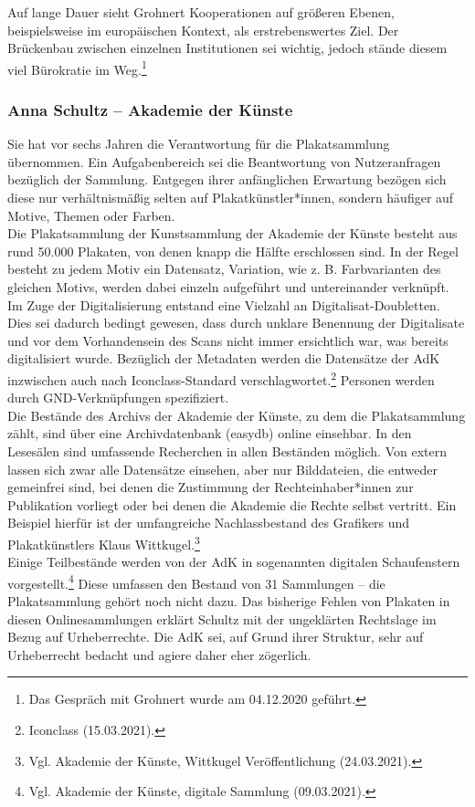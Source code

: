 \documentclass[a4paper,12pt,ngerman]{article}
\begin{document}
Auf lange Dauer sieht Grohnert Kooperationen auf größeren Ebenen, beispielsweise im europäischen Kontext, als erstrebenswertes Ziel. Der Brückenbau zwischen einzelnen Institutionen sei wichtig, jedoch stände diesem viel Bürokratie im Weg.\footnote{Das Gespräch mit Grohnert wurde am 04.12.2020 geführt.} \\

\subsubsection{Anna Schultz – Akademie der Künste}
Sie hat vor sechs Jahren die Verantwortung für die Plakatsammlung übernommen. Ein Aufgabenbereich sei die Beantwortung von Nutzeranfragen bezüglich der Sammlung. Entgegen ihrer anfänglichen Erwartung bezögen sich diese nur verhältnismäßig selten auf Plakatkünstler*innen, sondern häufiger auf Motive, Themen oder Farben. \\
Die Plakatsammlung der Kunstsammlung der Akademie der Künste besteht aus rund 50.000 Plakaten, von denen knapp die Hälfte erschlossen sind. In der Regel besteht zu jedem Motiv ein Datensatz, Variation, wie z. B. Farbvarianten des gleichen Motivs, werden dabei einzeln aufgeführt und untereinander verknüpft. Im Zuge der Digitalisierung entstand eine Vielzahl an Digitalisat-Doubletten. Dies sei dadurch bedingt gewesen, dass durch unklare Benennung der Digitalisate und vor dem Vorhandensein des Scans nicht immer ersichtlich war, was bereits digitalisiert wurde. Bezüglich der Metadaten werden die Datensätze der AdK inzwischen auch nach Iconclass-Standard verschlagwortet.\footnote{Iconclass (15.03.2021).} Personen werden durch GND-Verknüpfungen spezifiziert. \\
Die Bestände des Archivs der Akademie der Künste, zu dem die Plakatsammlung zählt, sind über eine Archivdatenbank (easydb) online einsehbar. In den Lesesälen sind umfassende Recherchen in allen Beständen möglich. Von extern lassen sich zwar alle Datensätze einsehen, aber nur Bilddateien, die entweder gemeinfrei sind, bei denen die Zustimmung der Rechteinhaber*innen zur Publikation vorliegt oder bei denen die Akademie die Rechte selbst vertritt. Ein Beispiel hierfür ist der umfangreiche Nachlassbestand des Grafikers und Plakatkünstlers Klaus Wittkugel.\footnote{Vgl. Akademie der Künste, Wittkugel Veröffentlichung (24.03.2021).} \\
Einige Teilbestände werden von der AdK in sogenannten digitalen Schaufenstern vorgestellt.\footnote{Vgl. Akademie der Künste, digitale Sammlung (09.03.2021).} Diese umfassen den Bestand von 31 Sammlungen – die Plakatsammlung gehört noch nicht dazu. Das bisherige Fehlen von Plakaten in diesen Onlinesammlungen erklärt Schultz mit der ungeklärten Rechtslage im Bezug auf Urheberrechte. Die AdK sei, auf Grund ihrer Struktur, sehr auf Urheberrecht bedacht und agiere daher eher zögerlich. \\
\end{document}
